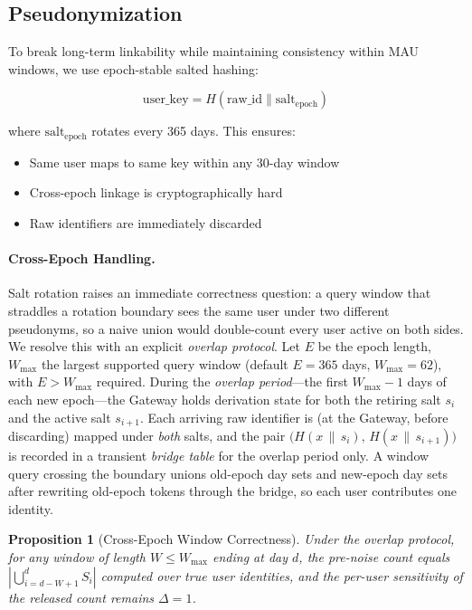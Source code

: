\documentclass[sigconf,anonymous,review]{acmart}
\newtheorem{proposition}[theorem]{Proposition}
\begin{document}
\subsection{Pseudonymization}
\label{sec:pseudonymization}

To break long-term linkability while maintaining consistency within MAU windows, we use epoch-stable salted hashing:

\[
    \text{user\_key} = H(\text{raw\_id} \| \text{salt}_{\text{epoch}})
\]

where $\text{salt}_{\text{epoch}}$ rotates every 365 days. This ensures:
\begin{itemize}
    \item Same user maps to same key within any 30-day window
    \item Cross-epoch linkage is cryptographically hard
    \item Raw identifiers are immediately discarded
\end{itemize}

\paragraph{Cross-Epoch Handling.} Salt rotation raises an immediate correctness question: a query window that straddles a rotation boundary sees the same user under two different pseudonyms, so a naive union would double-count every user active on both sides. We resolve this with an explicit \emph{overlap protocol}. Let $E$ be the epoch length, $W_{\max}$ the largest supported query window (default $E = 365$ days, $W_{\max} = 62$), with $E > W_{\max}$ required. During the \emph{overlap period}---the first $W_{\max} - 1$ days of each new epoch---the Gateway holds derivation state for both the retiring salt $s_{i}$ and the active salt $s_{i+1}$. Each arriving raw identifier is (at the Gateway, before discarding) mapped under \emph{both} salts, and the pair $\bigl(H(x \,\|\, s_i),\, H(x \,\|\, s_{i+1})\bigr)$ is recorded in a transient \emph{bridge table} for the overlap period only. A window query crossing the boundary unions old-epoch day sets and new-epoch day sets after rewriting old-epoch tokens through the bridge, so each user contributes one identity.

\begin{proposition}[Cross-Epoch Window Correctness]
    \label{prop:epoch-overlap}
    Under the overlap protocol, for any window of length $W \le W_{\max}$ ending at day $d$, the pre-noise count equals $|\bigcup_{i=d-W+1}^{d} S_i|$ computed over \emph{true} user identities, and the per-user sensitivity of the released count remains $\Delta = 1$.
\end{proposition}
\end{document}
